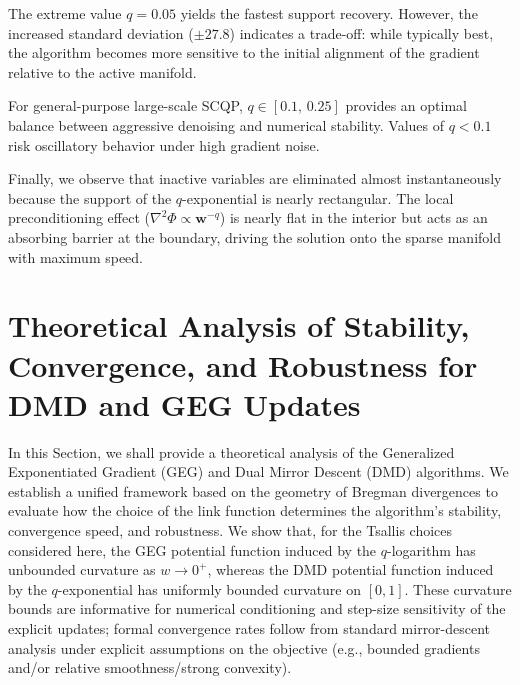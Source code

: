 \documentclass[10pt]{amsart}
\newcommand{\bw}{\boldsymbol{w}}
\theoremstyle{definition}
\theoremstyle{definition}	 %
\begin{document}
  
        The extreme value $q=0.05$ yields the fastest support recovery. However, the increased standard deviation ($\pm 27.8$) indicates a trade-off: while typically best, the algorithm becomes more sensitive to the initial alignment of the gradient relative to the active manifold.

 
        
For general-purpose large-scale SCQP, $q\in[0.1,\,0.25]$ provides an optimal balance between aggressive denoising and numerical stability.  Values of $q<0.1$ risk oscillatory behavior under high gradient noise.

       
     Finally, we observe that inactive variables are eliminated almost instantaneously because the support of the $q$-exponential is nearly  rectangular.  The local preconditioning effect ($\nabla^2\Phi\propto \bw^{-q}$) is nearly flat in the interior but acts as an absorbing barrier at the boundary, driving the  solution onto the sparse manifold with maximum speed.



\section{Theoretical Analysis of Stability, Convergence, and Robustness for DMD and GEG Updates} \label{Sec6}

In this Section, we shall provide a theoretical analysis of the Generalized Exponentiated Gradient (GEG) and Dual Mirror Descent (DMD) algorithms. We establish a unified framework based on the geometry of Bregman divergences \cite{Bregman1967} to evaluate how the choice of the link function determines the algorithm's stability, convergence speed, and robustness. We show that, for the Tsallis choices considered here, the GEG potential function induced by the $q$-logarithm has unbounded curvature as $w\to 0^+$, whereas the DMD potential function induced by the $q$-exponential has uniformly bounded curvature on $[0,1]$. These curvature bounds are informative for numerical conditioning and step-size sensitivity of the explicit updates; formal convergence rates follow from standard mirror-descent analysis under explicit assumptions on the objective (e.g., bounded gradients and/or relative smoothness/strong convexity).
\end{document}
